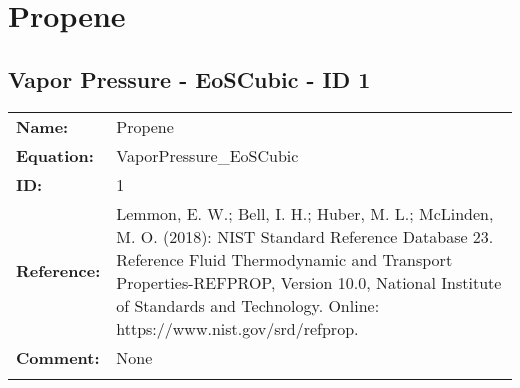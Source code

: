 \section{Propene}
%
\subsection{Vapor Pressure - EoSCubic - ID 1}
%
\begin{tabular}[l]{|lp{11.5cm}|}
\hline
\addlinespace

\textbf{Name:} & Propene \\
\textbf{Equation:} & VaporPressure\_EoSCubic \\
\textbf{ID:} & 1 \\
\textbf{Reference:} & Lemmon, E. W.; Bell, I. H.; Huber, M. L.; McLinden, M. O. (2018): NIST Standard Reference Database 23. Reference Fluid Thermodynamic and Transport Properties-REFPROP, Version 10.0, National Institute of Standards and Technology. Online: https://www.nist.gov/srd/refprop. \\
\textbf{Comment:} & None \\

\addlinespace
\hline
\end{tabular}
\newline

